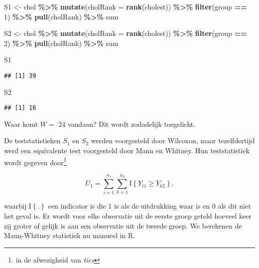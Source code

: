\documentclass[
  12pt,dutch,coursenotes]{book}
\newenvironment{Shaded}{\begin{snugshade}}{\end{snugshade}}
\newcommand{\DataTypeTok}[1]{\textcolor[rgb]{0.13,0.29,0.53}{#1}}
\newcommand{\DecValTok}[1]{\textcolor[rgb]{0.00,0.00,0.81}{#1}}
\newcommand{\KeywordTok}[1]{\textcolor[rgb]{0.13,0.29,0.53}{\textbf{#1}}}
\newcommand{\NormalTok}[1]{#1}
\newcommand{\OperatorTok}[1]{\textcolor[rgb]{0.81,0.36,0.00}{\textbf{#1}}}
\newcommand{\StringTok}[1]{\textcolor[rgb]{0.31,0.60,0.02}{#1}}
\theoremstyle{definition}
\theoremstyle{definition}
\theoremstyle{definition}
\theoremstyle{remark}
\begin{document}
\begin{Shaded}
\begin{Highlighting}[]
\NormalTok{S1 \textless{}{-}}\StringTok{ }\NormalTok{chol }\OperatorTok{\%\textgreater{}\%}\StringTok{ }\KeywordTok{mutate}\NormalTok{(}\DataTypeTok{cholRank =} \KeywordTok{rank}\NormalTok{(cholest)) }\OperatorTok{\%\textgreater{}\%}\StringTok{ }
\StringTok{    }\KeywordTok{filter}\NormalTok{(group }\OperatorTok{==}\StringTok{ }\DecValTok{1}\NormalTok{) }\OperatorTok{\%\textgreater{}\%}\StringTok{ }\KeywordTok{pull}\NormalTok{(cholRank) }\OperatorTok{\%\textgreater{}\%}\StringTok{ }\NormalTok{sum}

\NormalTok{S2 \textless{}{-}}\StringTok{ }\NormalTok{chol }\OperatorTok{\%\textgreater{}\%}\StringTok{ }\KeywordTok{mutate}\NormalTok{(}\DataTypeTok{cholRank =} \KeywordTok{rank}\NormalTok{(cholest)) }\OperatorTok{\%\textgreater{}\%}\StringTok{ }
\StringTok{    }\KeywordTok{filter}\NormalTok{(group }\OperatorTok{==}\StringTok{ }\DecValTok{2}\NormalTok{) }\OperatorTok{\%\textgreater{}\%}\StringTok{ }\KeywordTok{pull}\NormalTok{(cholRank) }\OperatorTok{\%\textgreater{}\%}\StringTok{ }\NormalTok{sum}

\NormalTok{S1}
\end{Highlighting}
\end{Shaded}

\begin{verbatim}
## [1] 39
\end{verbatim}

\begin{Shaded}
\begin{Highlighting}[]
\NormalTok{S2}
\end{Highlighting}
\end{Shaded}

\begin{verbatim}
## [1] 16
\end{verbatim}

Waar komt \(W=\) 24 vandaan? Dit wordt zodadelijk toegelicht.

De teststatistieken \(S_1\) en \(S_2\) werden voorgesteld door Wilcoxon, maar tezelfdertijd werd een equivalente test voorgesteld door Mann en Whitney. Hun teststatistiek wordt gegeven door\footnote{in de afwezigheid van \emph{ties}}

\[
 U_1 = \sum_{i=1}^{n_1}\sum_{k=1}^{n_2} \text{I}\left\{Y_{i1}\geq Y_{k2}\right\}.
\]

waarbij \(\text{I}\left\{.\right\}\) een indicator is die 1 is als de uitdrukking waar is en 0 als dit niet het geval is.
Er wordt voor elke observatie uit de eerste groep geteld hoeveel keer zij groter of gelijk is aan een observatie uit de tweede groep.
We berekenen de Mann-Whitney statistiek nu manueel in R.
\end{document}
